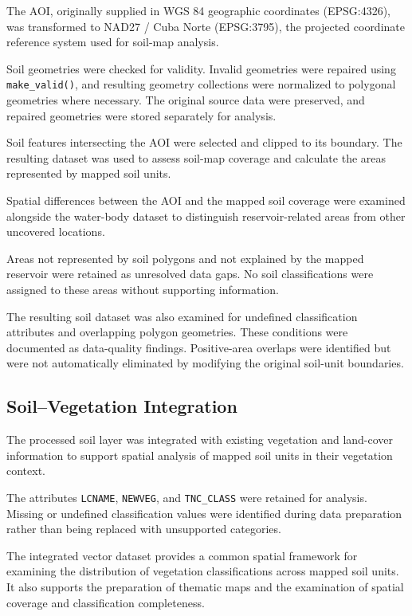 The AOI, originally supplied in WGS 84 geographic
coordinates (EPSG:4326), was transformed to
NAD27 / Cuba Norte (EPSG:3795), the projected
coordinate reference system used for soil-map
analysis.

Soil geometries were checked for validity.
Invalid geometries were repaired using
\texttt{make\_valid()}, and resulting geometry
collections were normalized to polygonal
geometries where necessary. The original source
data were preserved, and repaired geometries
were stored separately for analysis.

Soil features intersecting the AOI were selected
and clipped to its boundary. The resulting
dataset was used to assess soil-map coverage
and calculate the areas represented by mapped
soil units.

Spatial differences between the AOI and the
mapped soil coverage were examined alongside
the water-body dataset to distinguish
reservoir-related areas from other uncovered
locations.

Areas not represented by soil polygons and not
explained by the mapped reservoir were retained
as unresolved data gaps. No soil classifications
were assigned to these areas without supporting
information.

The resulting soil dataset was also examined
for undefined classification attributes and
overlapping polygon geometries. These conditions
were documented as data-quality findings.
Positive-area overlaps were identified but
were not automatically eliminated by modifying
the original soil-unit boundaries.


\subsection{Soil--Vegetation Integration}
\label{subsec:soil-vegetation-integration}

The processed soil layer was integrated with
existing vegetation and land-cover information
to support spatial analysis of mapped soil units
in their vegetation context.

The attributes \texttt{LCNAME}, \texttt{NEWVEG},
and \texttt{TNC\_CLASS} were retained for
analysis. Missing or undefined classification
values were identified during data preparation
rather than being replaced with unsupported
categories.

The integrated vector dataset provides a common
spatial framework for examining the distribution
of vegetation classifications across mapped
soil units. It also supports the preparation
of thematic maps and the examination of spatial
coverage and classification completeness.

